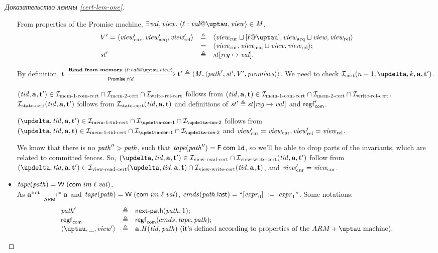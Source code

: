 \begin{proof}[Доказательство леммы \ref{cert-lem-one}]
\begin{itemize}
      From properties of the Promise machine, $\exists \stval, \R. \; \writeEvt{\loc}{\stval}{\tau}{\R} \in \Mprom$. \\
      \[\begin{array}{l l l}
      \V' = \angled{\Rcur', \Racq', \Rrel'} & \triangleq & \angled{\Rcur \sqcup [\loc @ \tau], \Racq \sqcup \R, \Rrel} \\
                                            & =          & \angled{\Rcur, \Racq \sqcup \R, \Rrel}; \\
      \PromState' & \triangleq & \PromState[\reg \mapsto \stval].
      \end{array}\]
      
      By definition, $\tT \promTStepReadLoc \tT' \triangleq \angled{\Mprom, \angled{\cpath', \PromState', \V', \PromSet}}$.
      We need to check $\invCert(n - 1, \delta, k, \aT, \tT')$.

      $(\mathit{tid}, \mathbf{a}, \mathbf{t}') \in \mathcal{I}_{\textup{\rm mem-1-com-cert}} \cap \mathcal{I}_{\textup{\rm mem-2-cert}} \cap \mathcal{I}_{\textup{\rm write-rel-cert}}$ follows from 
      $(\mathit{tid}, \mathbf{a}, \mathbf{t}) \in \mathcal{I}_{\textup{\rm mem-1-com-cert}} \cap \mathcal{I}_{\textup{\rm mem-2-cert}} \cap \mathcal{I}_{\textup{\rm write-rel-cert}}$.
      $\mathcal{I}_{\textup{\rm state-cert}}(\mathit{tid}, \mathbf{a}, \mathbf{t}')$ follows from $\mathcal{I}_{\textup{\rm state-cert}}(\mathit{tid}, \mathbf{a}, \mathbf{t})$ and definitions of
      $\mathit{st}' \triangleq \mathit{st}[\mathit{reg} \mapsto \mathit{val}]$ and $\mathsf{regf}_\mathsf{com}'$.

      $(\delta, \tId, \aT, \tT') \in \invMemZeroCERT \cap \invDeltaDefOne \cap \invDeltaDefTwo$ follows from
      $(\delta, \tId, \aT, \tT) \in \invMemZeroCERT \cap \invDeltaDefOne \cap \invDeltaDefTwo$ and
      $\mathit{view}_{\mathrm{cur}}' = \mathit{view}_{\mathrm{cur}}, \mathit{view}_{\mathrm{rel}}' = \mathit{view}_{\mathrm{rel}}$.

      We know that there is no $\mathit{path}'' > \mathit{path}$, such that $\mathit{tape}(\mathit{path}'') = \textsf{F} \; \mathsf{com} \; \mathtt{ld}$, so
      we'll be able to drop parts of the invariants, which are related to committed fences.
      So, $(\delta, \tId, \aT, \tT') \in \invViewReadCERT \cap \invViewWriteCERT(\tId, \aT, \tT')$ follow from
      $(\delta, \tId, \aT, \tT') \in \invViewReadCERT(\delta, \tId, \aT, \tT) \cap \invViewWriteCERT(\tId, \aT, \tT)$,
      and $\mathit{view}_{\mathrm{cur}}' = \mathit{view}_{\mathrm{cur}}$.
      
    \item $\mathit{tape}(\mathit{path}) = \textsf{W} \; (\mathsf{com} \; im \; \ell \; \mathit{val})$. \\
      As $\mathbf{a}^{\rm init} \xrightarrow[\mathsf{ARM}]{}^{*} \mathbf{a}$ and $\mathit{tape}(\mathit{path}) = \textsf{W} \; (\mathsf{com} \; im \; \ell \; \mathit{val})$,
      ${cmds}(\mathit{path}.\textup{\sf last}) = ``[\mathit{expr}_0]\;:=\;\mathit{expr}_1"$.
      Some notations:
      \[\begin{array}{l l l}
        \cpath'    & \triangleq & \nextPath{\cpath}{1}; \\
        \regstcom  & \triangleq & \regstcom(\Cprom, \tape, \cpath); \\
        \angled{\tau, \_, \R'} & \triangleq & \aT.\hmap(\tId, \cpath)
          \text{ (it's defined according to properties of the $\ARMt$ machine)}. \\


\end{array}\]
\end{itemize}
\end{proof}
